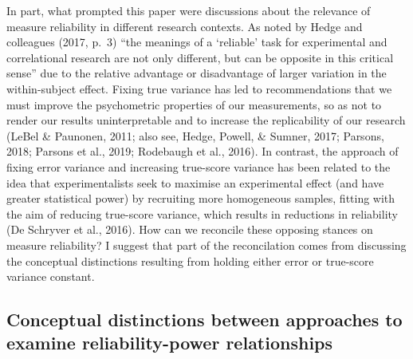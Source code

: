 \documentclass[english,,man]{apa6}
\begin{document}
In part, what prompted this paper were discussions about the relevance of measure reliability in different research contexts. As noted by Hedge and colleagues (2017, p.~3) \enquote{the meanings of a \enquote{reliable} task for experimental and correlational research are not only different, but can be opposite in this critical sense} due to the relative advantage or disadvantage of larger variation in the within-subject effect. Fixing true variance has led to recommendations that we must improve the psychometric properties of our measurements, so as not to render our results uninterpretable and to increase the replicability of our research (LeBel \& Paunonen, 2011; also see, Hedge, Powell, \& Sumner, 2017; Parsons, 2018; Parsons et al., 2019; Rodebaugh et al., 2016). In contrast, the approach of fixing error variance and increasing true-score variance has been related to the idea that experimentalists seek to maximise an experimental effect (and have greater statistical power) by recruiting more homogeneous samples, fitting with the aim of reducing true-score variance, which results in reductions in reliability (De Schryver et al., 2016). How can we reconcile these opposing stances on measure reliability? I suggest that part of the reconcilation comes from discussing the conceptual distinctions resulting from holding either error or true-score variance constant.

\hypertarget{conceptual-distinctions-between-approaches-to-examine-reliability-power-relationships}{%
\subsection{Conceptual distinctions between approaches to examine reliability-power relationships}\label{conceptual-distinctions-between-approaches-to-examine-reliability-power-relationships}}
\end{document}
